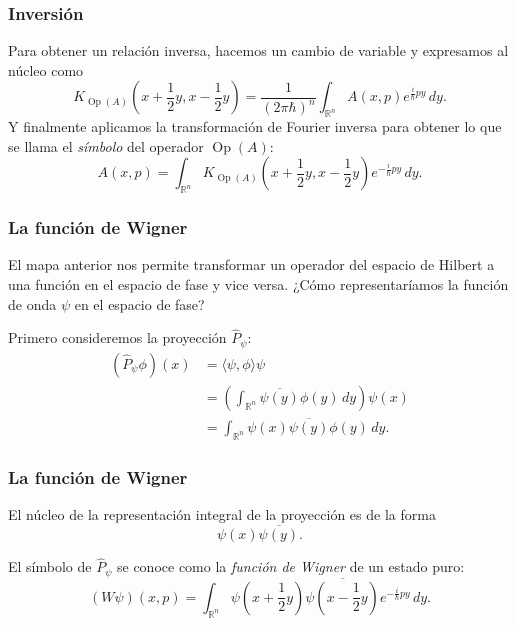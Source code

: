 \documentclass{beamer}
\DeclareMathOperator{\R}{\mathbb{R}}
\DeclareMathOperator{\Op}{Op}
\begin{document}
\begin{frame}
  \frametitle{Inversión}

  Para obtener un relación inversa, hacemos un cambio de
  variable y expresamos al núcleo como
  \begin{equation}
    K_{\Op(A)}\left(
      x + \frac{1}{2}y, x - \frac{1}{2}y
    \right)
    = \frac{1}{(2\pi\hbar)^{n}} \int_{\R^{n}}
    A(x,p) e^{\frac{i}{\hbar} p y} \, dy.
  \end{equation}
  Y finalmente aplicamos la transformación de Fourier
  inversa para obtener lo que se llama el \textit{símbolo}
  del operador $\Op(A)$:
  \begin{equation}
    A(x,p)
    = \int_{\R^{n}} K_{\Op(A)}\left( x + \frac{1}{2}y, x -
    \frac{1}{2}y \right) e^{-\frac{i}{\hbar} py} \, dy.
  \end{equation}
\end{frame}

\begin{frame}
  \frametitle{La función de Wigner}

  El mapa anterior nos permite transformar un operador del
  espacio de Hilbert a una función en el espacio de fase y
  vice versa. ¿Cómo representaríamos la función de onda
  $\psi$ en el espacio de fase?

  Primero consideremos la proyección $\hat{P}_\psi$:
  \begin{align}
    (\hat{P}_\psi \phi)(x)
    &= \langle \psi, \phi \rangle \psi \\
    &= \left(
      \int_{\R^{n}} \overline{\psi(y)}\phi(y) \, dy
      \right) \psi(x) \\
    &= \int_{\R^{n}} \psi(x)\overline{\psi(y)} \phi(y) \,
    dy.
  \end{align}
\end{frame}

\begin{frame}
  \frametitle{La función de Wigner}

  El núcleo de la representación integral de la proyección
  es de la forma
  \[
    \psi(x) \overline{\psi(y)}.
  \] 

  El símbolo de $\hat{P}_\psi$ se conoce como la
  \textit{función de Wigner} de un estado puro:
  \begin{equation}
    (W\psi)(x,p)
    = \int_{\R^{n}} \psi\left( x + \frac{1}{2} y \right)
    \overline{\psi\left( x - \frac{1}{2}y \right) }
    e^{-\frac{i}{\hbar} p y} \, dy.
  \end{equation}
\end{frame}
\end{document}
